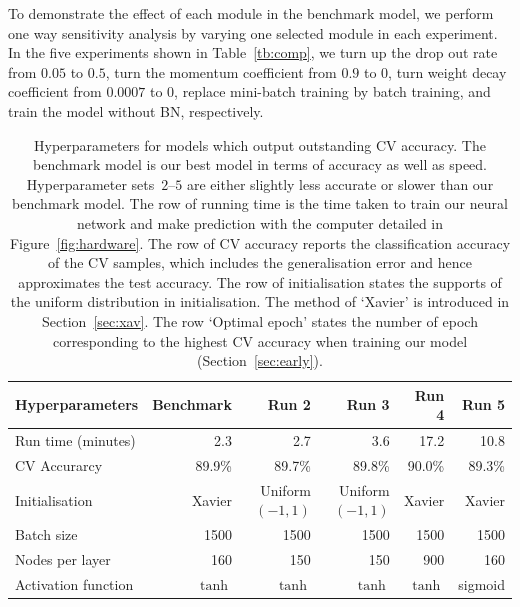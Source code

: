To demonstrate the effect of each module in the benchmark model, we perform one way sensitivity analysis by varying one selected module in each experiment. 
In the five experiments shown in Table~\ref{tb:comp}, we turn up the drop out rate from $0.05$ to $0.5$, turn the momentum coefficient from $0.9$ to $0$, turn weight decay coefficient from $0.0007$ to $0$, replace mini-batch training by batch training, and train the model without BN, respectively.
\begin{table}
\caption{Hyperparameters for models which output outstanding CV accuracy. The benchmark model is our best model in terms of accuracy as well as speed. Hyperparameter sets~$2$--$5$ are either slightly less accurate or slower than our benchmark model. The row of running time is the time taken to train our neural network and make prediction with the computer detailed in Figure~\ref{fig:hardware}. The row of CV accuracy reports the classification accuracy of the CV samples, which includes the generalisation error and hence approximates the test accuracy. The row of initialisation states the supports of the uniform distribution in initialisation. The method of `Xavier' is introduced in Section~\ref{sec:xav}. The row `Optimal epoch' states the number of epoch corresponding to the highest CV accuracy when training our model (Section~\ref{sec:early}). \label{table:best-four-steps}}
\centering
{
\begin{tabular}{@{}lrrrrr@{}}
\toprule
Hyperparameters                & Benchmark  & Run 2           & Run 3           & Run 4  & Run 5  \\ \midrule
Run time (minutes)             & 2.3     & 2.7              & 3.6              & 17.2    & 10.8    \\
CV Accurarcy                 & 89.9\%  & 89.7\%           & 89.8\%           & 90.0\%  & 89.3\%  \\ \midrule
Initialisation            & Xavier  & \parbox[t]{1.3cm}{\raggedleft Uniform\\$(-1,1)$} 
& \parbox[t]{1.3cm}{\raggedleft Uniform\\$(-1,1)$} 
                                                                            & Xavier  & Xavier  \\
Batch size                & 1500    & 1500             & 1500             & 1500    & 1500    \\
Nodes per layer         & 160     & 150              & 150              & 900     & 160     \\
Activation function       & $\tanh$ & $\tanh$          & $\tanh$          & $\tanh$ & sigmoid \\

\end{tabular}}
\end{table}
